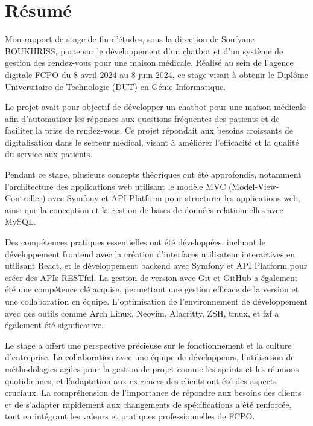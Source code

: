 \chapter*{Résumé}

\hspace{16pt}Mon rapport de stage de fin d’études, sous la direction de Soufyane BOUKHRISS, porte sur le développement d’un chatbot et d’un système de gestion des rendez-vous pour une maison médicale. Réalisé au sein de l'agence digitale FCPO du 8 avril 2024 au 8 juin 2024, ce stage visait à obtenir le Diplôme Universitaire de Technologie (DUT) en Génie Informatique.

Le projet avait pour objectif de développer un chatbot pour une maison médicale afin d'automatiser les réponses aux questions fréquentes des patients et de faciliter la prise de rendez-vous. Ce projet répondait aux besoins croissants de digitalisation dans le secteur médical, visant à améliorer l'efficacité et la qualité du service aux patients.

Pendant ce stage, plusieurs concepts théoriques ont été approfondis, notamment l'architecture des applications web utilisant le modèle MVC (Model-View-Controller) avec Symfony et API Platform pour structurer les applications web, ainsi que la conception et la gestion de bases de données relationnelles avec MySQL.

Des compétences pratiques essentielles ont été développées, incluant le développement frontend avec la création d'interfaces utilisateur interactives en utilisant React, et le développement backend avec Symfony et API Platform pour créer des APIs RESTful. La gestion de version avec Git et GitHub a également été une compétence clé acquise, permettant une gestion efficace de la version et une collaboration en équipe. L’optimisation de l’environnement de développement avec des outils comme Arch Linux, Neovim, Alacritty, ZSH, tmux, et fzf a également été significative.

Le stage a offert une perspective précieuse sur le fonctionnement et la culture d’entreprise. La collaboration avec une équipe de développeurs, l’utilisation de méthodologies agiles pour la gestion de projet comme les sprints et les réunions quotidiennes, et l'adaptation aux exigences des clients ont été des aspects cruciaux. La compréhension de l’importance de répondre aux besoins des clients et de s’adapter rapidement aux changements de spécifications a été renforcée, tout en intégrant les valeurs et pratiques professionnelles de FCPO.

